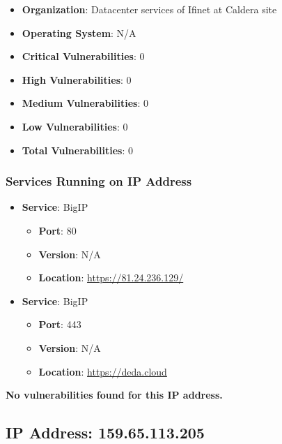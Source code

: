 \documentclass{article}
\begin{document}
\begin{itemize}
    \item \textbf{Organization}: Datacenter services of Ifinet at Caldera site
    \item \textbf{Operating System}:  N/A 
    \item \textbf{Critical Vulnerabilities}: 0
    \item \textbf{High Vulnerabilities}: 0
    \item \textbf{Medium Vulnerabilities}: 0
    \item \textbf{Low Vulnerabilities}: 0
    \item \textbf{Total Vulnerabilities}: 0
\end{itemize}

\subsubsection*{Services Running on IP Address}

\begin{itemize}
    
        \item \textbf{Service}: BigIP
        \begin{itemize}
            \item \textbf{Port}: 80
            \item \textbf{Version}:  N/A 
            \item \textbf{Location}: \href{ https://81.24.236.129/ }{ https://81.24.236.129/ }
        \end{itemize}
    
        \item \textbf{Service}: BigIP
        \begin{itemize}
            \item \textbf{Port}: 443
            \item \textbf{Version}:  N/A 
            \item \textbf{Location}: \href{ https://deda.cloud }{ https://deda.cloud }
        \end{itemize}
    
\end{itemize}


\textbf{No vulnerabilities found for this IP address.}




\clearpage



\subsection*{IP Address: 159.65.113.205}
\end{document}
